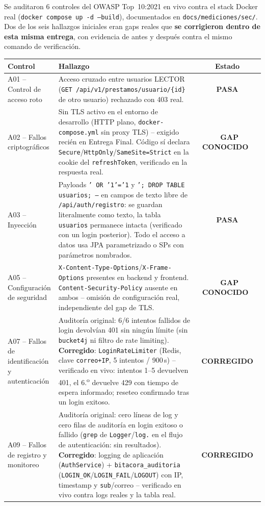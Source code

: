\documentclass[12pt,a4paper]{article}
\newcommand{\estadoPasa}{\colorbox{verdelight}{\color{white}\small\bfseries\ PASA\ }}
\newcommand{\estadoCorregido}{\colorbox{verdeuteq}{\color{white}\small\bfseries\ CORREGIDO\ }}
\newcommand{\estadoGap}{\colorbox{gapcolor}{\color{white}\small\bfseries\ GAP CONOCIDO\ }}
\begin{document}
Se auditaron 6 controles del OWASP Top~10:2021 en vivo contra el stack
Docker real (\texttt{docker compose up -d --build}), documentados en
\texttt{docs/mediciones/sec/}. Dos de los seis hallazgos iniciales eran
gaps reales que \textbf{se corrigieron dentro de esta misma entrega},
con evidencia de antes y después contra el mismo comando de verificación.

\begin{center}
\small
\begin{tabularx}{\linewidth}{|l|X|c|}
\hline
\rowcolor{verdeuteq}
\color{white}\textbf{Control} & \color{white}\textbf{Hallazgo} & \color{white}\textbf{Estado} \\
\hline
A01 -- Control de acceso roto &
Acceso cruzado entre usuarios LECTOR (\texttt{GET~/api/v1/prestamos/usuario/\{id\}} de otro usuario) rechazado con 403 real. &
\estadoPasa \\
\hline
A02 -- Fallos criptográficos &
Sin TLS activo en el entorno de desarrollo (HTTP plano, \texttt{docker-compose.yml} sin proxy TLS) -- exigido recién en Entrega Final. Código sí declara \texttt{Secure}/\texttt{HttpOnly}/\texttt{SameSite=Strict} en la cookie del \texttt{refreshToken}, verificado en la respuesta real. &
\estadoGap \\
\hline
A03 -- Inyección &
Payloads \texttt{' OR '1'='1} y \texttt{'; DROP TABLE usuarios; --} en campos de texto libre de \texttt{/api/auth/registro}: se guardan literalmente como texto, la tabla \texttt{usuarios} permanece intacta (verificado con un login posterior). Todo el acceso a datos usa JPA parametrizado o SPs con parámetros nombrados. &
\estadoPasa \\
\hline
A05 -- Configuración de seguridad &
\texttt{X-Content-Type-Options}/\texttt{X-Frame-Options} presentes en backend y frontend. \texttt{Content-Security-Policy} ausente en ambos -- omisión de configuración real, independiente del gap de TLS. &
\estadoGap \\
\hline
A07 -- Fallos de identificación y autenticación &
Auditoría original: 6/6 intentos fallidos de login devolvían 401 sin ningún límite (sin \texttt{bucket4j} ni filtro de rate limiting). \textbf{Corregido}: \texttt{LoginRateLimiter} (Redis, clave \texttt{correo+IP}, 5 intentos / 900\,s) -- verificado en vivo: intentos 1--5 devuelven 401, el 6.\textsuperscript{o} devuelve 429 con tiempo de espera informado; reseteo confirmado tras un login exitoso. &
\estadoCorregido \\
\hline
A09 -- Fallos de registro y monitoreo &
Auditoría original: cero líneas de log y cero filas de auditoría en login exitoso o fallido (\texttt{grep} de \texttt{Logger}/\texttt{log.} en el flujo de autenticación: sin resultados). \textbf{Corregido}: logging de aplicación (\texttt{AuthService}) + \texttt{bitacora\_auditoria} (\texttt{LOGIN\_OK}/\texttt{LOGIN\_FAIL}/\texttt{LOGOUT}) con IP, timestamp y \texttt{sub}/correo -- verificado en vivo contra logs reales y la tabla real. &
\estadoCorregido \\
\hline
\end{tabularx}
\end{center}
\end{document}
